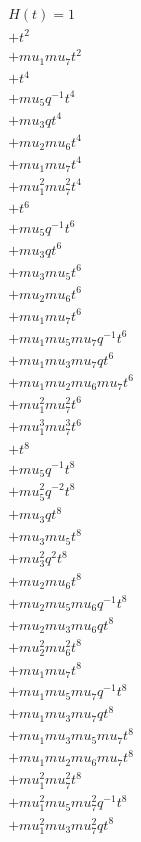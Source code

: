 \begin{align*}
H(t) = {}1 \\
  + t^{2} \\
  + mu_1 mu_7 t^{2} \\
  + t^{4} \\
  + mu_5 q^{-1} t^{4} \\
  + mu_3 q t^{4} \\
  + mu_2 mu_6 t^{4} \\
  + mu_1 mu_7 t^{4} \\
  + mu_1^{2} mu_7^{2} t^{4} \\
  + t^{6} \\
  + mu_5 q^{-1} t^{6} \\
  + mu_3 q t^{6} \\
  + mu_3 mu_5 t^{6} \\
  + mu_2 mu_6 t^{6} \\
  + mu_1 mu_7 t^{6} \\
  + mu_1 mu_5 mu_7 q^{-1} t^{6} \\
  + mu_1 mu_3 mu_7 q t^{6} \\
  + mu_1 mu_2 mu_6 mu_7 t^{6} \\
  + mu_1^{2} mu_7^{2} t^{6} \\
  + mu_1^{3} mu_7^{3} t^{6} \\
  + t^{8} \\
  + mu_5 q^{-1} t^{8} \\
  + mu_5^{2} q^{-2} t^{8} \\
  + mu_3 q t^{8} \\
  + mu_3 mu_5 t^{8} \\
  + mu_3^{2} q^{2} t^{8} \\
  + mu_2 mu_6 t^{8} \\
  + mu_2 mu_5 mu_6 q^{-1} t^{8} \\
  + mu_2 mu_3 mu_6 q t^{8} \\
  + mu_2^{2} mu_6^{2} t^{8} \\
  + mu_1 mu_7 t^{8} \\
  + mu_1 mu_5 mu_7 q^{-1} t^{8} \\
  + mu_1 mu_3 mu_7 q t^{8} \\
  + mu_1 mu_3 mu_5 mu_7 t^{8} \\
  + mu_1 mu_2 mu_6 mu_7 t^{8} \\
  + mu_1^{2} mu_7^{2} t^{8} \\
  + mu_1^{2} mu_5 mu_7^{2} q^{-1} t^{8} \\
  + mu_1^{2} mu_3 mu_7^{2} q t^{8} \\

\end{align*}
